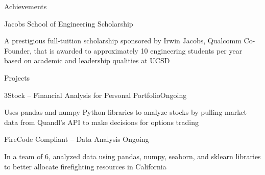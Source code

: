 \documentclass{resume} %
\newcommand{\tab}[1]{\hspace{.2667\textwidth}\rlap{#1}}
\newcommand{\itab}[1]{\hspace{0em}\rlap{#1}}
\begin{document}

\begin{rSection}{\faTrophy{ }}{Achievements} \begin{rSubsection}{}{Jacobs School of Engineering Scholarship}{}{}{}
\item A prestigious full-tuition scholarship sponsored by Irwin Jacobs, Qualcomm Co-Founder, that is awarded to approximately 10 engineering students per year based on academic and leadership qualities at UCSD 
\iffalse
\begin{rSubsection}{}{Regent Scholar}{}{}{}
\item A prestigious UC system-wide scholarship awarded to students for academic excellence
\end{rSubsection}
\fi
\end{rSubsection}
\end{rSection}

\iffalse
\begin{rSection}{}{Relevant Coursework}
\itab{Algorithm \& Systems Analysis} \tab{}  \tab{Computer Organization \& Systems Programs} 
\\ \itab{Data Structures \& OO Design} \tab{}  \tab{Financial \& Managerial Accounting} 
\\ \itab{Udemy coursework in HTML/CSS for Web Design} \tab{} \tab{Udemy coursework in Python for Financial Analysis}
\end{rSection}
\fi


\begin{rSection}{\faDatabase{ }}{Projects} 

\begin{rSubsection}{}{3Stock -- Financial Analysis for Personal Portfolio}{Ongoing}{}{}
\item Uses pandas and numpy Python libraries to analyze stocks by pulling market data from Quandl's API to make decisions for options trading
\end{rSubsection}
\begin{rSubsection}{}{FireCode Compliant -- Data Analysis }{Ongoing}{}{}
\item In a team of 6, analyzed data using pandas, numpy, seaborn, and sklearn libraries to better allocate firefighting resources in California

\end{rSubsection}
\end{rSection}
\end{document}
